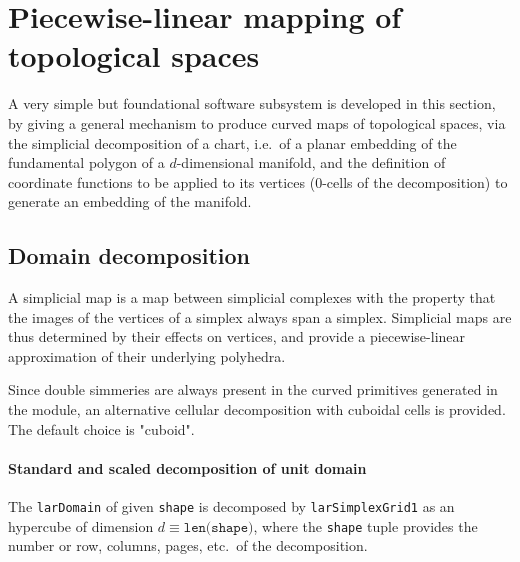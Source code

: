 \documentclass[11pt,oneside]{article}    %
\begin{document}
\section{Piecewise-linear mapping of topological spaces}

A very simple but foundational software subsystem is developed in this section, by giving a general mechanism to produce curved maps of topological spaces, via the simplicial decomposition of a chart, i.e.~of a planar embedding of the fundamental polygon of a $d$-dimensional manifold, and the definition of coordinate functions to be applied to its vertices ($0$-cells of the decomposition) to generate an embedding of the manifold.

\subsection{Domain decomposition}

A simplicial map is a map between simplicial complexes with the property that the images of the vertices of a simplex always span a simplex.  Simplicial maps are thus determined by their effects on vertices, and provide a piecewise-linear approximation of their underlying polyhedra. 

Since double simmeries are always present in the curved primitives generated in the module, an alternative cellular decomposition with cuboidal cells is provided.  The default choice is "cuboid".


\paragraph{Standard and scaled decomposition of unit domain}
The \texttt{larDomain} of given \texttt{shape} is decomposed by \texttt{larSimplexGrid1} as an hypercube of dimension $d \equiv\texttt{len(shape)}$, where the \texttt{shape} tuple provides the number or row, columns, pages, etc.~of the decomposition.
\end{document}
